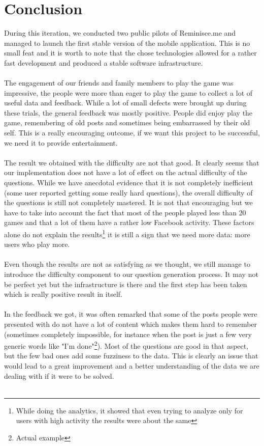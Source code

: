 \chapter{Conclusion}
During this iteration, we conducted two public pilots of Reminisce.me and managed to launch the first stable version of the mobile application. This is no small feat and it is worth to note that the chose technologies allowed for a rather fast development and produced a stable software infrastructure.\\\\
The engagement of our friends and family members to play the game was impressive, the people were more than eager to play the game to collect a lot of useful data and feedback. While a lot of small defects were brought up during these trials, the general feedback was mostly positive. People did enjoy play the game, remembering of old posts and sometimes being embarrassed by their old self. This is a really encouraging outcome, if we want this project to be successful, we need it to provide entertainment.\\\\
The result we obtained with the difficulty are not that good. It clearly seems that our implementation does not have a lot of effect on the actual difficulty of the questions. While we have anecdotal evidence that it is not completely inefficient (some user reported getting some really hard questions), the overall difficulty of the questions is still not completely mastered. It is not that encouraging but we have to take into account the fact that most of the people played less than 20 games and that a lot of them have a rather low Facebook activity. These factors alone do not explain the results\footnote{While doing the analytics, it showed that even trying to analyze only for users with high activity the results were about the same} it is still a sign that we need more data: more users who play more.\\\\
Even though the results are not as satisfying as we thought, we still manage to introduce the difficulty component to our question generation process. It may not be perfect yet but the infrastructure is there and the first step has been taken which is really positive result in itself.\\\\
In the feedback we got, it was often remarked that some of the posts people were presented with do not have a lot of content which makes them hard to remember (sometimes completely impossible, for instance when the post is just a few very generic words like "I'm done"\footnote{Actual example}). Most of the questions are good in that aspect, but the few bad ones add some fuzziness to the data. This is clearly an issue that would lead to a great improvement and a better understanding of the data we are dealing with if it were to be solved.\\\\

